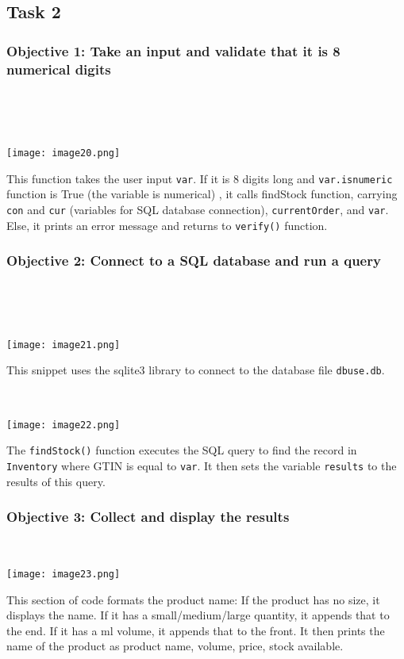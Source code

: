 \documentclass[a4paper]{article}
\begin{document}
\newpage
\subsection{Task 2}
\subsubsection{Objective 1: Take an input and validate that it is 8 numerical digits} ~\par ~\par
\noindent\texttt{[image: image20.png]} ~\par
This function takes the user input \verb?var?. If it is 8 digits long and \verb|var.isnumeric| function is True (the variable is numerical) , it calls findStock function, carrying \verb?con? and \verb?cur? (variables for SQL database connection), \verb?currentOrder?, and \verb?var?. Else, it prints an error message and returns to \verb|verify()| function.
\subsubsection{Objective 2: Connect to a SQL database and run a query} ~\par ~\par
\noindent\texttt{[image: image21.png]} ~\par
This snippet uses the sqlite3 library to connect to the database file \verb?dbuse.db?. ~\par ~\par
\noindent\texttt{[image: image22.png]} ~\par
The \verb|findStock()| function executes the SQL query to find the record in \verb?Inventory? where GTIN is equal to \verb?var?. It then sets the variable \verb?results? to the results of this query. ~\par
\subsubsection{Objective 3: Collect and display the results} ~\par 
\noindent\texttt{[image: image23.png]} \par
This section of code formats the product name: If the product has no size, it displays the name. If it has a small/medium/large quantity, it appends that to the end. If it has a ml volume, it appends that to the front. It then prints the name of the product as product name, volume, price, stock available.
\newpage
\end{document}
